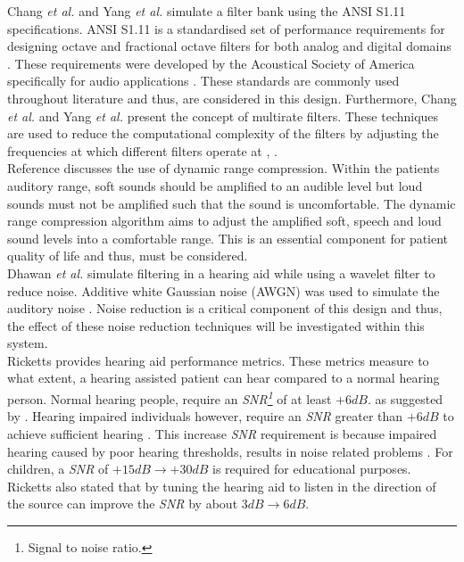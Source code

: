 \documentclass[11pt,onecolumn]{witseiepaper}
\begin{document}
\newline
\noindent Chang \textit{et al.} \cite{chang} and Yang \textit{et al.} \cite{ansiAtten} simulate a filter bank using the ANSI S1.11 specifications. ANSI S1.11 is a standardised set of performance requirements for designing octave and fractional octave filters for both analog and digital domains \cite{ansiDoc}. These requirements were developed by the Acoustical Society of America specifically for audio applications \cite{ansiDoc}. These standards are commonly used throughout literature and thus, are considered in this design. Furthermore, Chang \textit{et al.} and Yang \textit{et al.} present the concept of multirate filters. These techniques are used to reduce the computational complexity of the filters by adjusting the frequencies at which different filters operate at \cite{chang}, \cite{ansiAtten}.\\
\newline
\noindent Reference \cite{compressHand} discusses the use of dynamic range compression. Within the patients auditory range, soft sounds should be amplified to an audible level but loud sounds must not be amplified such that the sound is uncomfortable. The dynamic range compression algorithm aims to adjust the amplified soft, speech and loud sound levels into a comfortable range. This is an essential component for patient quality of life and thus, must be considered.\\
\newline
\noindent Dhawan \textit{et al.} simulate filtering in a hearing aid while using a wavelet filter to reduce noise. Additive white Gaussian noise (AWGN) was used to simulate the auditory noise \cite{dhawan}. Noise reduction is a critical component of this design and thus, the effect of these noise reduction techniques will be investigated within this system. \\
\newline
\noindent Ricketts \cite{ricketts} provides hearing aid performance metrics. These metrics measure to what extent, a hearing assisted patient can hear compared to a normal hearing person. Normal hearing people, require an \textit{SNR\footnote{Signal to noise ratio.}} of at least $+6dB.$ as suggested by \cite{moore}. Hearing impaired individuals however, require an \textit{SNR} greater than $+6dB$ to achieve sufficient hearing \cite{tillman}. This increase \textit{SNR} requirement is because impaired hearing caused by poor hearing thresholds, results in noise related problems \cite{ricketts}. For children, a \textit{SNR} of $+15dB \rightarrow +30dB$ is required for educational purposes. Ricketts also stated that by tuning the hearing aid to listen in the direction of the source can improve the \textit{SNR} by about $3dB \rightarrow 6dB$.\\
\end{document}
